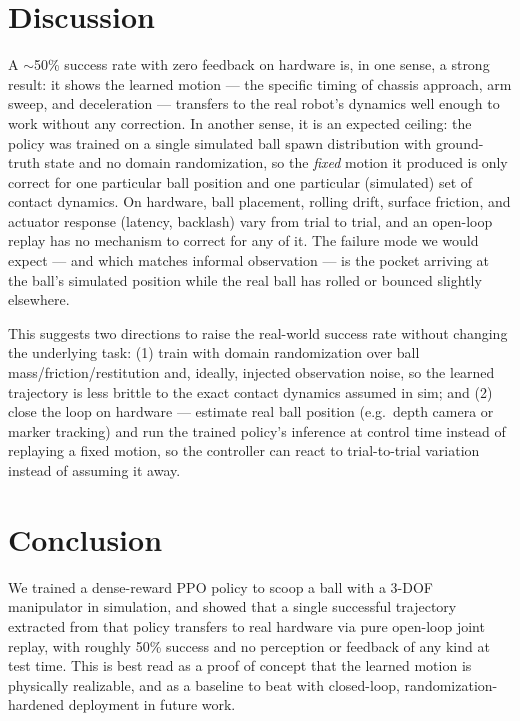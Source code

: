 \documentclass[11pt]{article}
\begin{document}
\section{Discussion}
\label{sec:discussion}

A $\sim$50\% success rate with zero feedback on hardware is, in one sense, a
strong result: it shows the learned motion --- the specific timing of chassis
approach, arm sweep, and deceleration --- transfers to the real robot's
dynamics well enough to work without any correction. In another sense, it is
an expected ceiling: the policy was trained on a single simulated ball spawn
distribution with ground-truth state and no domain randomization, so the
\emph{fixed} motion it produced is only correct for one particular ball
position and one particular (simulated) set of contact dynamics. On hardware,
ball placement, rolling drift, surface friction, and actuator response
(latency, backlash) vary from trial to trial, and an open-loop replay has no
mechanism to correct for any of it. The failure mode we would expect --- and
which matches informal observation --- is the pocket arriving at the ball's
simulated position while the real ball has rolled or bounced slightly
elsewhere.

This suggests two directions to raise the real-world success rate without
changing the underlying task: (1) train with domain randomization over ball
mass/friction/restitution and, ideally, injected observation noise, so the
learned trajectory is less brittle to the exact contact dynamics assumed in
sim; and (2) close the loop on hardware --- estimate real ball position (e.g.\
depth camera or marker tracking) and run the trained policy's inference at
control time instead of replaying a fixed motion, so the controller can react
to trial-to-trial variation instead of assuming it away.

\section{Conclusion}
\label{sec:conclusion}

We trained a dense-reward PPO policy to scoop a ball with a 3-DOF manipulator
in simulation, and showed that a single successful trajectory extracted from
that policy transfers to real hardware via pure open-loop joint replay, with
roughly 50\% success and no perception or feedback of any kind at test time.
This is best read as a proof of concept that the learned motion is physically
realizable, and as a baseline to beat with closed-loop, randomization-hardened
deployment in future work.
\end{document}
